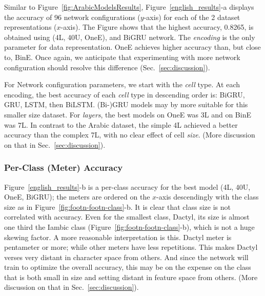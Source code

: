 Similar to Figure~\ref{fig:ArabicModelsResults}, Figure~\ref{english_results}-a displays the accuracy of 96 network configurations ($y$-axis) for each of the 2 dataset representations
($x$-axis). The Figure shows that the highest accuracy, 0.8265, is obtained using (4L, 40U,
OneE), and BiGRU network. The \textit{encoding} is the only parameter for data representation. OneE
achieves higher accuracy than, but close to, BinE. Once again, we anticipate that experimenting
with more network configuration should resolve this difference (Sec.~\ref{sec:discussion}).

For Network configuration parameters, we start with the \textit{cell} type. At each encoding, the
best accuracy of each \textit{cell} type in descending order is: BiGRU, GRU, LSTM, then
BiLSTM\@. (Bi-)GRU models may by more suitable for this smaller size dataset. For \textit{layers},
the best models on OneE was 3L and on BinE was 7L. In contrast to the Arabic dataset, the simple 4L
achieved a better accuracy than the complex 7L, with no clear effect of cell \textit{size}. (More
discussion on that in Sec.~\ref{sec:discussion}).

\bigskip

\subsubsection{Per-Class (Meter) Accuracy}\label{sec:per-class-meter}
Figure~\ref{english_results}-b is a per-class accuracy for the best model (4L, 40U, OneE, BiGRU);
the meters are ordered on the $x$-axis descendingly with the class size as in
Figure~\ref{fig:footn-footn-class}-b. It is clear that class size is not correlated with
accuracy. Even for the smallest class, Dactyl, its size is almost one third the Iambic class
(Figure~\ref{fig:footn-footn-class}-b), which is not a huge skewing factor. A more reasonable
interpretation is this. Dactyl meter is pentameter or more; while other meters have less
repetitions. This makes Dactyl verses very distant in character space from others. And since the
network will train to optimize the overall accuracy, this may be on the expense on the class that is
both small in size and setting distant in feature space from others. (More discussion on that in
Sec.~\ref{sec:discussion}).
